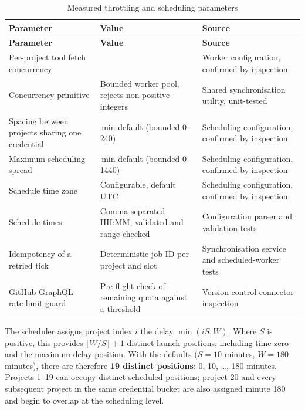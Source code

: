 \begin{longtable}{
  >{\raggedright\arraybackslash}p{}
  >{\raggedright\arraybackslash}p{}
  >{\raggedright\arraybackslash}p{}
}
\caption{Measured throttling and scheduling parameters}
\label{tab:sync-parameters}\\
\toprule
\textbf{Parameter} & \textbf{Value} & \textbf{Source} \\
\midrule
\endfirsthead
\toprule
\textbf{Parameter} & \textbf{Value} & \textbf{Source} \\
\midrule
\endhead
\bottomrule
\endlastfoot
Per-project tool fetch concurrency & 4 & Worker configuration, confirmed by
inspection \\
\addlinespace
Concurrency primitive & Bounded worker pool, rejects non-positive integers &
Shared synchronisation utility, unit-tested \\
\addlinespace
Spacing between projects sharing one credential & 10\,min default (bounded
0--240) & Scheduling configuration, confirmed by inspection \\
\addlinespace
Maximum scheduling spread & 180\,min default (bounded 0--1440) & Scheduling
configuration, confirmed by inspection \\
\addlinespace
Schedule time zone & Configurable, default UTC & Scheduling configuration,
confirmed by inspection \\
\addlinespace
Schedule times & Comma-separated HH:MM, validated and range-checked &
Configuration parser and validation tests \\
\addlinespace
Idempotency of a retried tick & Deterministic job ID per project and slot &
Synchronisation service and scheduled-worker tests \\
\addlinespace
GitHub GraphQL rate-limit guard & Pre-flight check of remaining quota against a
threshold & Version-control connector inspection \\
\end{longtable}

The scheduler assigns project index $i$ the delay $\min(iS, W)$. Where $S$ is
positive, this provides $\lfloor W/S \rfloor + 1$ distinct launch positions,
including time zero and the maximum-delay position. With the defaults
($S = 10$ minutes, $W = 180$ minutes), there are therefore \textbf{19 distinct
positions}: 0, 10, \ldots, 180 minutes. Projects 1--19 can occupy distinct
scheduled positions; project 20 and every subsequent project in the same
credential bucket are also assigned minute 180 and begin to overlap at the
scheduling level.

